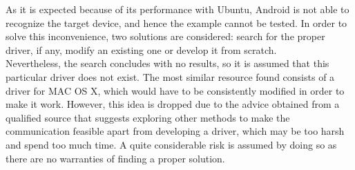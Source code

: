 \begin{enumerate}
\begin{comment}
				After a few days of unsuccesfull days of investigation, we find in a forum a small mention in a 
				comment about android actually implements HID protocol. This protocol was also suported by the 
				MSP430 API, and although the information was found in a not very condiable place, we find it 
				enought to put the full team to work in this, ones made the android USB host(link) and others 
				find a HID aplication into the API to load into the MSP430. The second objetive was attenpted 
				first, with this we can check that our android device finally detect our MSP430. \\ %
				\end{comment}
				
				As it is expected because of its performance with Ubuntu, Android is not able to recognize the
				target device, and hence the example cannot be tested. In order to solve this inconvenience, two
				solutions are considered: search for the proper driver, if any, modify an existing one or develop
				it from scratch.\\
				
				Nevertheless, the search concludes with no results, so it is assumed that this particular driver does
				not exist. The most similar resource found consists of a driver for MAC OS X, which would have to 
				be consistently modified in order to make it work. However, this idea is dropped due to the advice
				obtained from a qualified source that suggests exploring other methods to make the communication
				feasible apart from developing a driver, which may be too harsh and spend too much time.
				A quite considerable risk is assumed by doing so as there are no warranties of finding a proper solution.\\
				

\end{enumerate}
